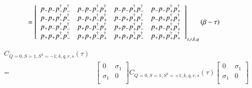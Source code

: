 \begin{equation}
  \begin{aligned}    
    &= \left[ 
    {\begin{array}{cccc}
      p_{-}p_{-}p^\dagger_{-}p^\dagger_{-} & p_{-}p_{-}p^\dagger_{-}p^\dagger_{+} & p_{-}p_{-}p^\dagger_{+}p^\dagger_{-} & p_{-}p_{-}p^\dagger_{+}p^\dagger_{+} \\
      p_{-}p_{+}p^\dagger_{-}p^\dagger_{-} & p_{-}p_{+}p^\dagger_{-}p^\dagger_{+} & p_{-}p_{+}p^\dagger_{+}p^\dagger_{-} & p_{-}p_{+}p^\dagger_{+}p^\dagger_{+} \\
      p_{+}p_{-}p^\dagger_{-}p^\dagger_{-} & p_{+}p_{-}p^\dagger_{-}p^\dagger_{+} & p_{+}p_{-}p^\dagger_{+}p^\dagger_{-} & p_{+}p_{-}p^\dagger_{+}p^\dagger_{+} \\
      p_{+}p_{+}p^\dagger_{-}p^\dagger_{-} & p_{+}p_{+}p^\dagger_{-}p^\dagger_{+} & p_{+}p_{+}p^\dagger_{+}p^\dagger_{-} & p_{+}p_{+}p^\dagger_{+}p^\dagger_{+} \\
    \end{array} } \right]_{s,r,k,q} (\beta-\tau)
  \end{aligned}
\end{equation}

\begin{equation}
  \begin{aligned}
    C_{Q=0,S=1,S^3=-1;k,q,r,s} (\tau) \\
    =& \left[ {\begin{array}{cc}
      0 & \sigma_1 \\
      \sigma_1 & 0 \\
    \end{array} } \right]
    C_{Q=0,S=1,S^3=+1;k,q,r,s} (\tau)
    \left[ {\begin{array}{cc}
      0 & \sigma_1 \\
      \sigma_1 & 0 \\
    \end{array} } \right]
  \end{aligned}
\end{equation}

